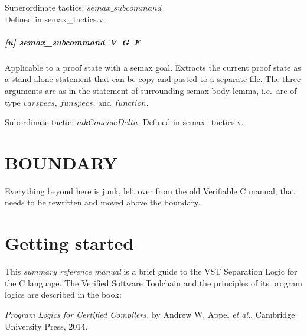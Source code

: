 \documentclass[12pt,fleqn,openany,oneside,showtrims]{memoir}
\begin{document}
Superordinate tactics:  $\mathit{semax\_subcommand}$\\
Defined in semax\_tactics.v. 

\paragraph{[u] semax\_subcommand\ V\ G\ F}
Applicable to a proof state with a semax goal.
Extracts the current proof state as a stand-alone
statement that can be copy-and pasted to a separate file.
The three arguments are as in the statement of surrounding semax-body
lemma, i.e.~are of type $\mathit{varspecs}$, $\mathit{funspecs}$, and
$\mathit{function}$. 

Subordinate tactic: $\mathit{mkConciseDelta}$.
Defined in semax\_tactics.v. 



\chapter{BOUNDARY}
Everything beyond here is junk, left over from the
old Verifiable C manual, that needs to be rewritten and moved
above the boundary.

\chapter{Getting started}

This \emph{summary reference manual} 
is a brief guide to the
VST Separation Logic for the C language.
The Verified Software Toolchain and
the principles of its program logics
are described in the book:

\noindent \emph{\large Program Logics for Certified Compilers,}\newline
by Andrew W. Appel \emph{et al.},
Cambridge University Press, 2014.  
\vspace{-2ex}
\end{document}
